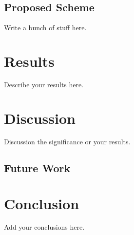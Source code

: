 \documentclass[PhD]{PHlab-thesis}
\begin{document}
\section{Proposed Scheme}
Write a bunch of stuff here.

	
\chapter{Results}
Describe your results here.


\chapter{Discussion}
Discussion the significance or your results.


\section{Future Work}


\chapter{Conclusion}
Add your conclusions here.


\newpage
{}
\printbibliography
\end{document}
